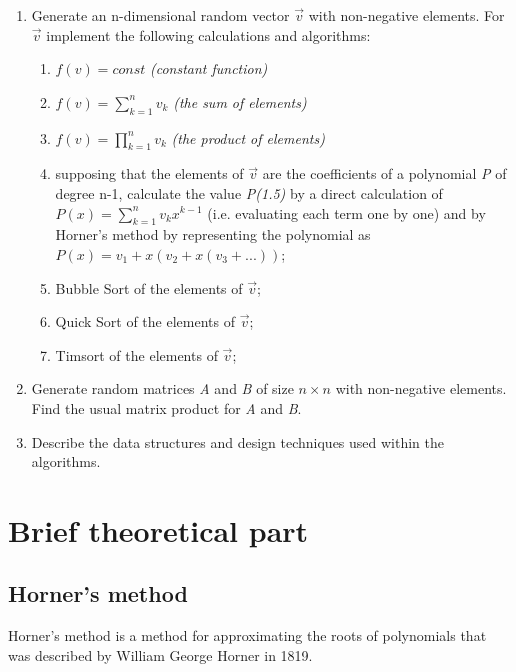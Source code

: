 \documentclass[a4paper,article,14pt]{extarticle}
\begin{document}
	\begin{enumerate}
		\item Generate an n-dimensional random vector $\vec{v}$ with non-negative elements. For $\vec{v}$  implement the following calculations and algorithms:
		\begin{enumerate}
			\item \begin{math} f(v) = const \end{math} \textit{(constant function)}
			\item \begin{math} f(v) = \sum_{k=1}^n v_k\end{math} \textit{(the sum of elements)}
			\item \begin{math} f(v) = \prod_{k=1}^n v_k\end{math} \textit{(the product of elements)}
			\item supposing that the elements of $\vec{v}$ are the coefficients of a polynomial \textit{P} of degree n-1, calculate the value \textit{P(1.5)} by a direct calculation of $P(x)=\sum_{k=1}^n v_k x^{k-1}$ (i.e. evaluating each term one by one) and by Horner’s method by representing the polynomial as $P(x)=v_1+x(v_2+x(v_3+...))$;
			\item Bubble Sort of the elements of $\vec{v}$;
			\item Quick Sort of the elements of $\vec{v}$;
			\item Timsort of the elements of $\vec{v}$;
		\end{enumerate}
		\item Generate random matrices \textit{A} and \textit{B} of size $n\times n$ with non-negative elements. Find the usual matrix product for \textit{A} and \textit{B}.
		\item Describe the data structures and design techniques used within the algorithms.
	\end{enumerate}
	
	\section{Brief theoretical part}
	\subsection{Horner's method}
	
	Horner's method is a method for approximating the roots of polynomials that was described by William George Horner in 1819.
	
\end{document}
